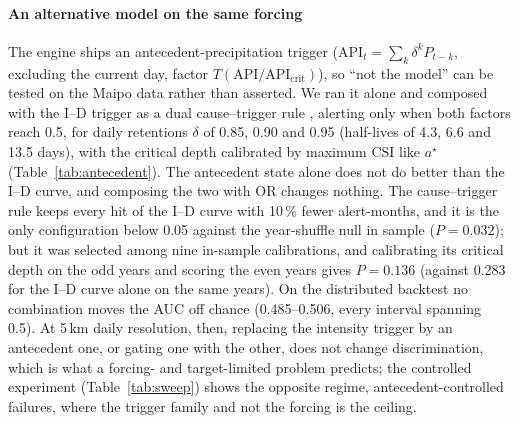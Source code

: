 \documentclass[authoryear,preprint,review,12pt]{elsarticle}
\begin{document}
\paragraph{An alternative model on the same forcing}
The engine ships an antecedent-precipitation trigger (API$_t=\sum_k \delta^k P_{t-k}$,
excluding the current day, factor $T(\mathrm{API}/\mathrm{API}_\mathrm{crit})$), so ``not the model'' can be tested on the
Maipo data rather than asserted. We ran it alone and composed with the I--D trigger
as a dual cause--trigger rule \citep{bogaard2018}, alerting only when both factors
reach 0.5, for daily retentions $\delta$ of 0.85, 0.90 and 0.95 (half-lives of 4.3,
6.6 and 13.5 days), with the critical depth calibrated by maximum CSI like $a^\star$
(Table~\ref{tab:antecedent}). The antecedent state alone does not do better than the
I--D curve, and composing the two with OR changes nothing. The cause--trigger rule
keeps every hit of the I--D curve with 10\,\% fewer alert-months, and it is the only
configuration below 0.05 against the year-shuffle null in sample ($P=0.032$); but it
was selected among nine in-sample calibrations, and calibrating its critical depth on
the odd years and scoring the even years gives $P=0.136$ (against 0.283 for the I--D
curve alone on the same years). On the distributed backtest no combination moves the
AUC off chance (0.485--0.506, every interval spanning 0.5). At 5\,km daily resolution,
then, replacing the intensity trigger by an antecedent one, or gating one with the
other, does not change discrimination, which is what a forcing- and target-limited
problem predicts; the controlled experiment (Table~\ref{tab:sweep}) shows the
opposite regime, antecedent-controlled failures, where the trigger family and not
the forcing is the ceiling.
\end{document}
